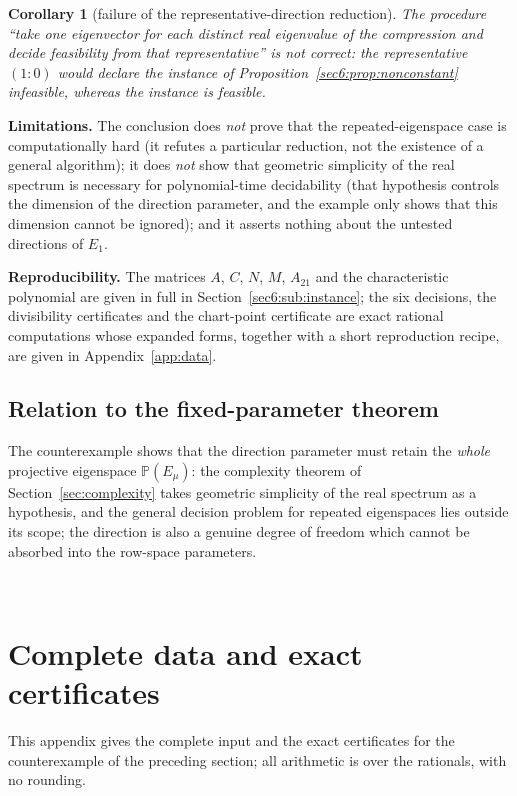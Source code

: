 \documentclass[journal]{IEEEtran}
\theoremstyle{plainn}
\newtheorem{cor}[thm]{Corollary}
\theoremstyle{remark}
\begin{document}
\begin{cor}[failure of the representative-direction reduction]\label{sec6:cor:reduction}
The procedure ``take one eigenvector for each distinct real eigenvalue of the compression and decide
feasibility from that representative'' is not correct: the representative $(1\!:\!0)$ would declare the
instance of Proposition~\ref{sec6:prop:nonconstant} infeasible, whereas the instance is feasible.
\end{cor}

\textbf{Limitations.} The conclusion does \emph{not} prove that the repeated-eigenspace case is
computationally hard (it refutes a particular reduction, not the existence of a general algorithm); it
does \emph{not} show that geometric simplicity of the real spectrum is necessary for polynomial-time
decidability (that hypothesis controls the dimension of the direction parameter, and the example only
shows that this dimension cannot be ignored); and it asserts nothing about the untested directions of
$E_1$.

\textbf{Reproducibility.} The matrices $A$, $C$, $N$, $M$, $A_{21}$ and the characteristic polynomial
are given in full in Section~\ref{sec6:sub:instance}; the six decisions, the divisibility certificates
and the chart-point certificate are exact rational computations whose expanded forms, together with a
short reproduction recipe, are given in Appendix~\ref{app:data}.

\subsection{Relation to the fixed-parameter theorem}\label{sec6:sub:relation}

The counterexample shows that the direction parameter must retain the \emph{whole} projective eigenspace
$\mathbb{P}(E_\mu)$: the complexity theorem of Section~\ref{sec:complexity} takes geometric simplicity of
the real spectrum as a hypothesis, and the general decision problem for repeated eigenspaces lies
outside its scope; the direction is also a genuine degree of freedom which cannot be absorbed into the
row-space parameters.


\appendices
﻿\section{Complete data and exact certificates}
\label{appA}\label{app:data}
This appendix gives the complete input and the exact certificates for the counterexample of the
preceding section; all arithmetic is over the rationals, with no rounding.
\end{document}
